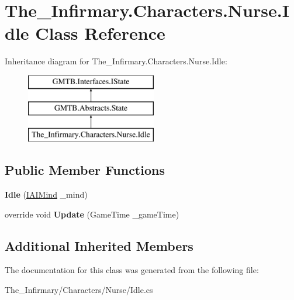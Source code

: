 \hypertarget{class_the___infirmary_1_1_characters_1_1_nurse_1_1_idle}{}\section{The\+\_\+\+Infirmary.\+Characters.\+Nurse.\+Idle Class Reference}
\label{class_the___infirmary_1_1_characters_1_1_nurse_1_1_idle}
Inheritance diagram for The\+\_\+\+Infirmary.\+Characters.\+Nurse.\+Idle\+:\begin{figure}[H]
\begin{center}
\leavevmode
\includegraphics[height=3.000000cm]{class_the___infirmary_1_1_characters_1_1_nurse_1_1_idle}
\end{center}
\end{figure}
\subsection*{Public Member Functions}
\begin{DoxyCompactItemize}
\item 
\mbox{\label{class_the___infirmary_1_1_characters_1_1_nurse_1_1_idle_a400e111d054bfc75fcdcca0b1dac1a8e}} 
{\bfseries Idle} (\mbox{\hyperlink{interface_g_m_t_b_1_1_interfaces_1_1_i_a_i_mind}{I\+A\+I\+Mind}} \+\_\+mind)
\item 
\mbox{\label{class_the___infirmary_1_1_characters_1_1_nurse_1_1_idle_a3dca5653818b172eaa408ddf354fc66d}} 
override void {\bfseries Update} (Game\+Time \+\_\+game\+Time)
\end{DoxyCompactItemize}
\subsection*{Additional Inherited Members}


The documentation for this class was generated from the following file\+:\begin{DoxyCompactItemize}
\item 
The\+\_\+\+Infirmary/\+Characters/\+Nurse/Idle.\+cs\end{DoxyCompactItemize}
